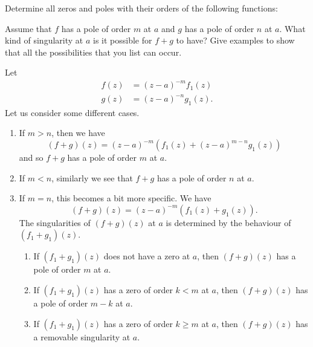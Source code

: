 
\setcounter{question}{0}
\question Determine all zeros and poles with their orders of the following functions:

\setcounter{question}{2}
\question Assume that $f$ has a pole of order $m$ at $a$ and $g$ has a pole of order $n$ at $a$.
What kind of singularity at $a$ is it possible for $f + g$ to have?
Give examples to show that all the possibilities that you list can occur.
\begin{solution}
    Let
    \begin{align*}
        f(z) &= (z-a)^{-m}f_1(z) \\
        g(z) &= (z-a)^{-n}g_1(z).
    \end{align*}
    Let us consider some different cases.
    \begin{enumerate}
        \item 
            If $m > n$, then we have
            \[
                (f+g)(z) = (z-a)^{-m} \left(f_1(z) + (z-a)^{m-n} g_1(z)\right)
            \]
            and so $f+g$ has a pole of order $m$ at $a$.

        \item 
            If $m < n$, similarly we see that $f + g$ has a pole of order $n$ at $a$.

        \item 
            If $m = n$, this becomes a bit more specific.
            We have
            \[
                (f+g)(z) = (z-a)^{-m} (f_1(z)+g_1(z)).
            \]
            The singularities of $(f+g)(z)$ at $a$ is determined
            by the behaviour of $(f_1 + g_1)(z)$.
            \begin{enumerate}
                \item If $(f_1+g_1)(z)$ does not have a zero at $a$,
                    then $(f+g)(z)$ has a pole of order $m$ at $a$.

                \item If $(f_1+g_1)(z)$ has a zero of order $k < m$ at $a$,
                    then $(f+g)(z)$ has a pole of order $m - k$ at $a$.

                \item If $(f_1+g_1)(z)$ has a zero of order $k \geq m$ at $a$,
                    then $(f+g)(z)$ has a removable singularity at $a$.
            \end{enumerate}
    \end{enumerate}
\end{solution}

